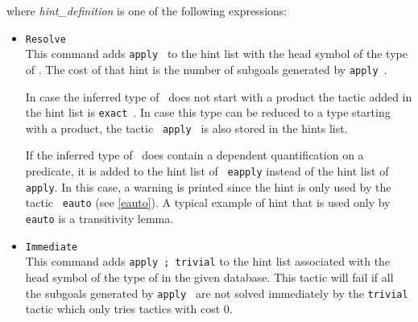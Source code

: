 \noindent where {\sl hint\_definition} is one of the following expressions:

\begin{itemize}
\item \texttt{Resolve} {\term} \\
  This command adds {\tt apply {\term}} to the hint list
  with the head symbol of the type of \term. The cost of that hint is
  the number of subgoals generated by {\tt apply {\term}}.
  
  In case the inferred type of \term\ does not start with a product the
  tactic added in the hint list is {\tt exact {\term}}. In case this
  type can be reduced to a type starting with a product, the tactic {\tt
    apply {\term}} is also stored in the hints list.
  
  If the inferred type of \term\ does contain a dependent
  quantification on a predicate, it is added to the hint list of {\tt
    eapply} instead of the hint list of {\tt apply}. In this case, a
  warning is printed since the hint is only used by the tactic {\tt
    eauto} (see \ref{eauto}). A typical example of hint that is used
  only by \texttt{eauto} is a transitivity lemma.



\item \texttt{Immediate {\term}} \\
  
  This command adds {\tt apply {\term}; trivial} to the hint list
  associated with the head symbol of the type of \ident in the given
  database. This tactic will fail if all the subgoals generated by
  {\tt apply {\term}} are 
  not solved immediately by the {\tt trivial} tactic which only tries
  tactics with cost $0$.
  

\end{itemize}
